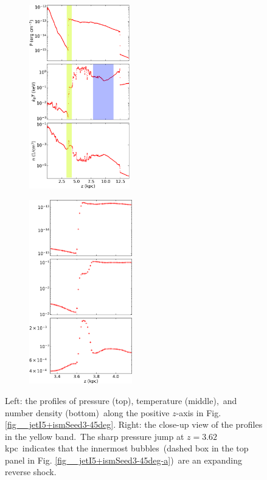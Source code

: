 \documentclass[fleqn,usenatbib,useAMS]{mnras}
\begin{document}
 \begin{figure}%
      \begin{subfigure}[t]{0.5\linewidth}%
         \includegraphics[height=8cm]{figures/fig__profile-1.png}%
         \label{fig__profile-1}%
      \end{subfigure}%
      \hspace{4pt}
      \begin{subfigure}[t]{0.5\linewidth}%
         \includegraphics[height=8cm]{figures/fig__profile-2.png}%
         \label{fig__profile-2}%
      \end{subfigure}%
      \caption{
             Left: the profiles of pressure (top), temperature (middle),\
             and number density (bottom)\
             along the positive $z$-axis in Fig. \ref{fig__jetI5+ismSeed3-45deg}.
             Right: the close-up view of the profiles in the yellow band.\
             The sharp pressure jump at $z=3.62$ kpc\
             indicates that the innermost bubbles\
             (dashed box in the top panel in Fig. \ref{fig__jetI5+ismSeed3-45deg-a})\
             are an expanding reverse shock.
      }%
      \label{fig__profile}%
 \end{figure}%
\end{document}
